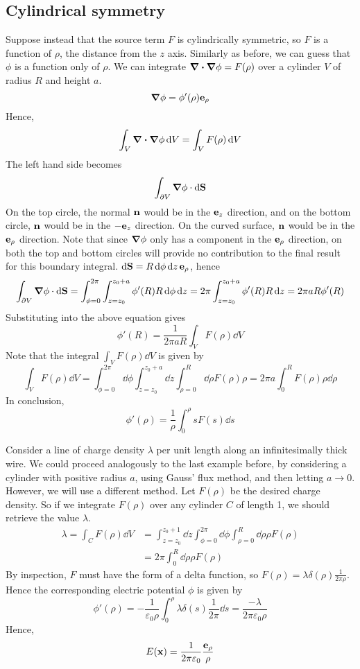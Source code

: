 \subsection{Cylindrical symmetry}
Suppose instead that the source term \(F\) is cylindrically symmetric, so \(F\) is a function of \(\rho\), the distance from the \(z\) axis.
Similarly as before, we can guess that \(\phi\) is a function only of \(\rho\).
We can integrate \(\div{\grad{\phi}} = F(\rho)\) over a cylinder \(V\) of radius \(R\) and height \(a\).
\[
	\grad{\phi} = \phi'(\rho) \vb e_\rho
\]
Hence,
\[
	\int_{V} \div{\grad{\phi}} \dd{V} = \int_{V} F(\rho) \dd{V}
\]
The left hand side becomes
\[
	\int_{\partial V} \grad\phi \cdot \dd{\vb S}
\]
On the top circle, the normal \(\vb n\) would be in the \(\vb e_z\) direction, and on the bottom circle, \(\vb n\) would be in the \(-\vb e_z\) direction.
On the curved surface, \(\vb n\) would be in the \(\vb e_\rho\) direction.
Note that since \(\grad\phi\) only has a component in the \(\vb e_\rho\) direction, on both the top and bottom circles will provide no contribution to the final result for this boundary integral.
\(\dd{\vb S} = R \dd{\phi} \dd{z} \vb e_\rho\), hence
\[
	\int_{\partial V} \grad\phi \cdot \dd{\vb S}
	= \int_{\phi = 0}^{2 \pi} \int_{z = z_0}^{z_0 + a} \phi'(R) R \dd{\phi} \dd{z}
	= 2\pi \int_{z = z_0}^{z_0 + a} \phi'(R) R \dd{z}
	= 2\pi a R \phi'(R)
\]
Substituting into the above equation gives
\[
	\phi'(R) = \frac{1}{2\pi a R} \int_{V} F(\rho) \dd{V}
\]
Note that the integral \(\int_{V} F(\rho) \dd{V}\) is given by
\[
	\int_{V} F(\rho) \dd{V} = \int_{\phi = 0}^{2 \pi} \dd{\phi} \int_{z = z_0}^{z_0 + a} \dd{z} \int_{\rho = 0}^R \dd{\rho} F(\rho) \rho = 2 \pi a \int_0^R F(\rho) \rho \dd{\rho}
\]
In conclusion,
\[
	\phi'(\rho) = \frac{1}{\rho} \int_0^\rho sF(s) \dd{s}
\]

\begin{example}
	Consider a line of charge density \(\lambda\) per unit length along an infinitesimally thick wire.
	We could proceed analogously to the last example before, by considering a cylinder with positive radius \(a\), using Gauss' flux method, and then letting \(a \to 0\).
	However, we will use a different method.
	Let \(F(\rho)\) be the desired charge density.
	So if we integrate \(F(\rho)\) over any cylinder \(C\) of length 1, we should retrieve the value \(\lambda\).
	\begin{align*}
		\lambda = \int_{C} F(\rho) \dd{V} & = \int_{z = z_0}^{z_0 + 1} \dd{z} \int_{\phi = 0}^{2 \pi} \dd{\phi} \int_{\rho = 0}^R \dd{\rho} \rho F(\rho) \\
		                                  & = 2 \pi \int_{0}^R \dd{\rho} \rho F(\rho)
	\end{align*}
	By inspection, \(F\) must have the form of a delta function, so \(F(\rho) = \lambda \delta(\rho) \frac{1}{2 \pi \rho}\).
	Hence the corresponding electric potential \(\phi\) is given by
	\[
		\phi'(\rho) = -\frac{1}{\varepsilon_0 \rho} \int_0^\rho \lambda \delta(s) \frac{1}{2 \pi} \dd{s} = \frac{-\lambda}{2\pi\varepsilon_0 \rho}
	\]
	Hence,
	\[
		E(\vb x) = \frac{1}{2 \pi \varepsilon_0} \frac{\vb e_\rho}{\rho}
	\]
\end{example}

